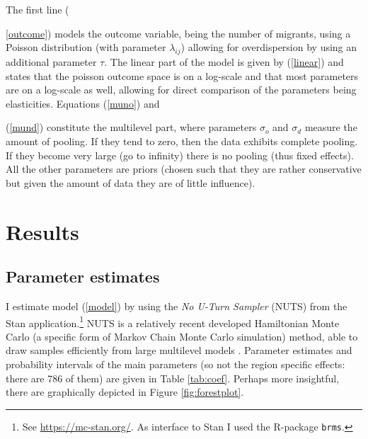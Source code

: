 \documentclass[12pt, parskip, abstracton,notitlepage]{scrartcl}
\begin{document}
The first line ({\ref{outcome}) models the outcome variable,
	being the number of migrants, using a Poisson distribution
	(with parameter $\lambda_{ij}$) allowing for overdispersion
	by using an additional parameter $\tau$. The linear part of
	the model is given by (\ref{linear}) and states that the
	poisson outcome space is on a log-scale and that most
	parameters are on a log-scale as well, allowing for direct
	comparison of the parameters being elasticities. Equations
	(\ref{muno}) and {(\ref{mund}) constitute the multilevel
		part, where parameters $\sigma_o$ and $\sigma_d$ measure
		the amount of pooling. If they tend to zero, then the
		data exhibits complete pooling. If they become very large
		(go to infinity) there is no pooling (thus fixed
		effects). All the other parameters are priors (chosen such
		that they are rather conservative but given the amount of
		data they are of little influence).
		
		\section{Results}
		
		\subsection{Parameter estimates}
		
		I estimate model (\ref{model}) by using the \emph{No U-Turn
			Sampler} (NUTS) from the Stan application.\footnote{See \href{https://mc-stan.org/}{https://mc-stan.org/}. As interface to Stan
			\citep[see for an overview article of
			Stan][]{carpenter2017stan} I used the R-package \citep{brms} \texttt{brms}.} NUTS is a relatively recent developed Hamiltonian Monte Carlo (a specific form of Markov
		Chain Monte Carlo simulation) method, able to draw samples
		efficiently from large multilevel models
		\citep{hoffman2014no}. Parameter estimates and probability
		intervals of the main parameters (so not the region specific
		effects: there are 786 of them) are given in Table
		\ref{tab:coef}. Perhaps more insightful, there are graphically
		depicted in Figure \ref{fig:forestplot}.
		
}}
\end{document}

